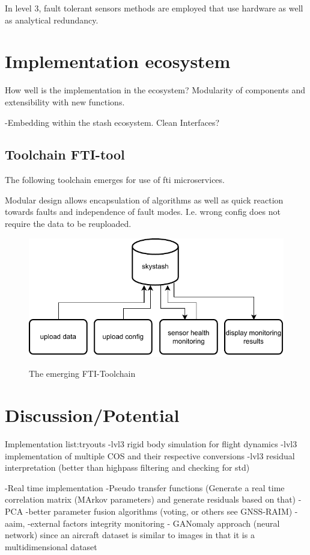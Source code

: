 In level 3, fault tolerant sensors methods are employed that use hardware as well as analytical redundancy. \cite[p.355-365]{isermann_fault-diagnosis_2006}





\section{Implementation ecosystem}

How well is the implementation in the ecosystem? Modularity of components and extensibility with new functions.


-Embedding within the stash ecosystem. Clean Interfaces?



\subsection{Toolchain FTI-tool}
The following toolchain emerges for use of fti microservices.

Modular design allows encapsulation of algorithms as well as quick reaction towards faults and independence of fault modes.
I.e. wrong config does not require the data to be reuploaded.


\begin{figure}
    \centering
    \includegraphics[width=.7\textwidth]{03_figures/FTI_microservices}
    \label{fig:fti-micro}
    \caption{The emerging FTI-Toolchain}
\end{figure}


\section{Discussion/Potential}

Implementation list:tryouts
-lvl3 rigid body simulation for flight dynamics
-lvl3 implementation of multiple COS and their respective conversions
-lvl3 residual interpretation (better than highpass filtering and checking for std)

-Real time implementation
-Pseudo transfer functions (Generate a real time correlation matrix (MArkov parameters) and generate residuals based on that)
-PCA
-better parameter fusion algorithms (voting, or others see GNSS-RAIM)
        -aaim,
        -external factors integrity monitoring
- GANomaly approach (neural network) since an aircraft dataset is similar to images in that it is a multidimensional dataset

